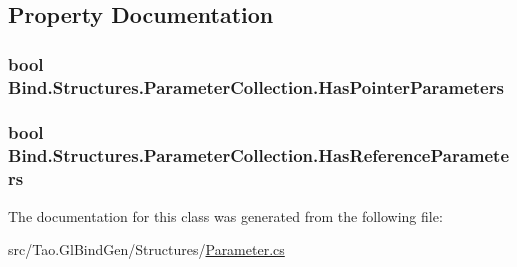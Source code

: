 \subsection{Property Documentation}
\hypertarget{class_bind_1_1_structures_1_1_parameter_collection_a7f29ba27c46fe4dcd76dd7ef4d8390a1}{
\subsubsection[{HasPointerParameters}]{\setlength{\rightskip}{0pt plus 5cm}bool Bind.Structures.ParameterCollection.HasPointerParameters}}
\label{class_bind_1_1_structures_1_1_parameter_collection_a7f29ba27c46fe4dcd76dd7ef4d8390a1}
\hypertarget{class_bind_1_1_structures_1_1_parameter_collection_aeb29ae39d1533fa59225bd1834d175b3}{
\subsubsection[{HasReferenceParameters}]{\setlength{\rightskip}{0pt plus 5cm}bool Bind.Structures.ParameterCollection.HasReferenceParameters}}
\label{class_bind_1_1_structures_1_1_parameter_collection_aeb29ae39d1533fa59225bd1834d175b3}


The documentation for this class was generated from the following file:\begin{DoxyCompactItemize}
\item 
src/Tao.GlBindGen/Structures/\hyperlink{_parameter_8cs}{Parameter.cs}\end{DoxyCompactItemize}
